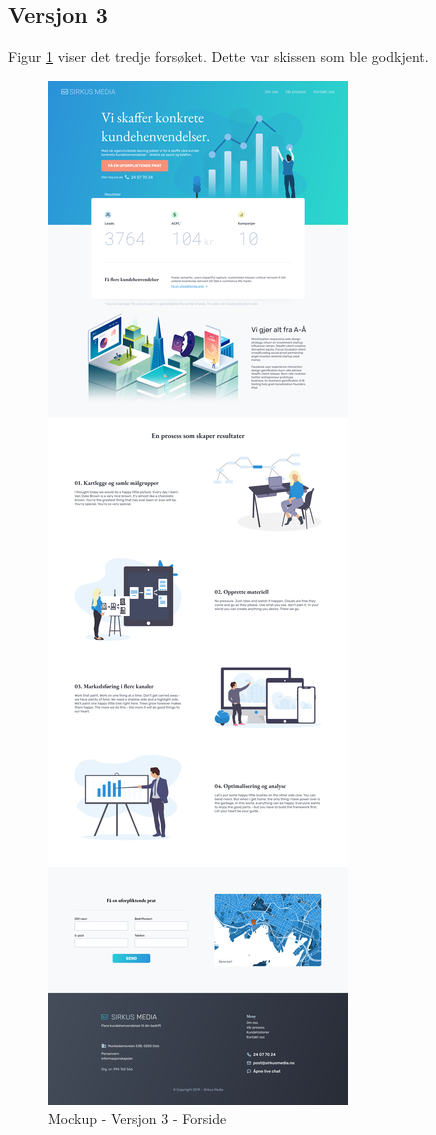 \subsection{Versjon 3}
Figur \ref{fig:mockup-v3-index} viser det tredje forsøket. Dette var skissen som ble godkjent.
\begin{figure}[H]
    \centering
    \includegraphics[height=.82\textheight]{design/mockup3-index.png}
    \caption{Mockup - Versjon 3 - Forside}
    \label{fig:mockup-v3-index}
\end{figure}

